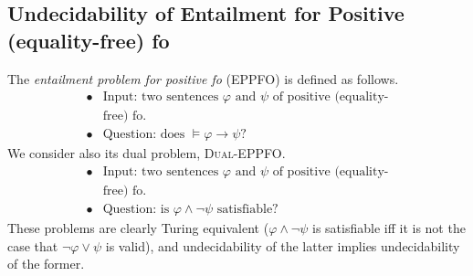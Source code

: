 \documentclass{LMCS}
\begin{document}
\subsection{Undecidability of Entailment for Positive (equality-free) fo}
\label{LHS:sec:undecidable}

The \emph{entailment problem for positive fo} (\textsc{EPPFO}) is defined as follows.
\[
\begin{array}{ll}
\bullet & \mbox{Input: two sentences $\varphi$ and $\psi$ of positive (equality-} \\
& \mbox{free) fo.} \\
\bullet & \mbox{Question: does $\models \varphi \rightarrow \psi$?} 
\end{array}
\]
We consider also its dual problem, \textsc{Dual-EPPFO}.
\[
\begin{array}{ll}
\bullet & \mbox{Input: two sentences $\varphi$ and $\psi$ of positive (equality-} \\
& \mbox{free) fo.} \\
\bullet & \mbox{Question: is $\varphi \wedge \neg \psi$ satisfiable?} 
\end{array}
\]
These problems are clearly Turing equivalent ($\varphi \wedge \neg \psi$ is satisfiable iff it is not the case that $\neg \varphi \vee \psi$ is valid), and undecidability of the latter implies undecidability of the former.
\end{document}
